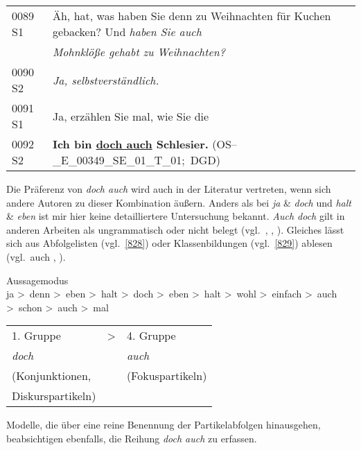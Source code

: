 \begin{exe}
	\ex\label{827} 

    \begin{tabularx}{\linewidth}[t]{@{}lX@{}}
	0089 S1 & Äh, hat, was haben Sie denn zu Weihnachten für Kuchen gebacken? Und \emph{haben Sie auch}\\
 	& \emph{Mohnklöße gehabt zu Weihnachten?}\\
	0090 S2 & \emph{Ja, selbstverständlich.}\\
	0091 S1	& Ja, erzählen Sie mal, wie Sie die\\
	0092 S2 & \textbf{Ich bin \ul{doch auch} Schlesier.}	
	\newline\hbox{}\hfill\hbox{\scshape(OS--\_E\_00349\_SE\_01\_T\_01; DGD)}	 
    \end{tabularx}       
\end{exe}	
Die Präferenz von \textit{doch auch} wird auch in der Literatur vertreten, wenn sich andere Autoren zu dieser Kombination äußern. Anders als bei \textit{ja} \& \textit{doch} und \textit{halt} \& \textit{eben} ist mir hier keine detaillier\-tere Untersuchung bekannt. \textit{Auch doch} gilt in anderen Arbeiten als ungrammatisch oder nicht belegt (vgl.\ \citealt[227, 230]{Dahl1988}, \citealt[356]{Lemnitzer2001}, \citealt[196]{Kwon2005}). Gleiches lässt sich aus Abfolgelisten (vgl.\ \ref{828}) oder Klassenbildungen (vgl.\ \ref{829}) ablesen (vgl.\ auch \citealt[91--94]{Engel1968}, \citealt[42]{Helbig1981}).

\begin{exe}
	\ex\label{828}Aussagemodus\\
	ja \textgreater\ denn \textgreater\ eben \textgreater\ halt \textgreater\ doch \textgreater\ eben \textgreater\ halt \textgreater\ wohl \textgreater\ einfach \textgreater\ auch \textgreater\ schon \textgreater\ auch \textgreater\ mal\hfill\hbox{\citet[908, 1542]{Zifonun1997}}	
\end{exe}


\begin{exe}
	\ex\label{829} 
    \begin{tabular}[t]{@{}lll@{}}
	1. Gruppe & > & 4. Gruppe\\
	\textit{doch} & {} & \textit{auch}\\
	(Konjunktionen, & {} & (Fokuspartikeln)\\
	Diskurspartikeln) & &			 
    \end{tabular}\hfill\hbox{\citet[31]{Thurmair1991}}   
\end{exe}	
Modelle, die über eine reine Benennung der Partikelabfolgen hinausgehen, beabsichtigen ebenfalls, die Reihung \textit{doch auch} zu erfassen. 

